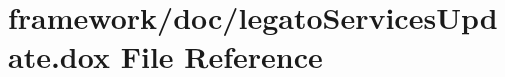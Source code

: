 \hypertarget{legato_services_update_8dox}{}\section{framework/doc/legato\+Services\+Update.dox File Reference}
\label{legato_services_update_8dox}
